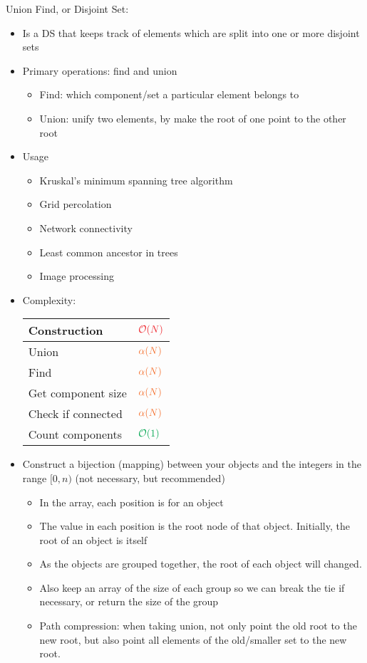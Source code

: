 Union Find, or Disjoint Set:
\begin{itemize}
	\item Is a \ac{DS} that keeps track of elements which are split into one or more disjoint sets
	\item Primary operations: find and union
	\begin{itemize}
		\item Find: which component/set a particular element belongs to
		\item Union: unify two elements, by make the root of one point to the other root
	\end{itemize}
	\item Usage
	\begin{itemize}
		\item Kruskal's minimum spanning tree algorithm
		\item Grid percolation
		\item Network connectivity
		\item Least common ancestor in trees
		\item Image processing
	\end{itemize}
	\item Complexity:
	\begin{center}
		\begin{tabular}{|l|l|}
			\hline
			Construction & $ \color{Red} \mathcal{O}(N) $ \\ \hline
			Union & $ \color{Orange} \alpha(N) $ \\ \hline
			Find & $ \color{Orange} \alpha(N) $ \\ \hline
			Get component size & $ \color{Orange} \alpha(N) $ \\ \hline
			Check if connected & $ \color{Orange} \alpha(N) $ \\ \hline
			Count components & $ \color{Green} \mathcal{O}(1) $ \\ \hline
		\end{tabular}
	\end{center}
	\item Construct a bijection (mapping) between your objects and the integers in the range $ [0, n) $ (not necessary, but recommended)
	\begin{itemize}
		\item In the array, each position is for an object
		\item The value in each position is the root node of that object. Initially, the root of an object is itself
		\item As the objects are grouped together, the root of each object will changed.
		\item Also keep an array of the size of each group so we can break the tie if necessary, or return the size of the group
		\item Path compression: when taking union, not only point the old root to the new root, but also point all elements of the old/smaller set to the new root.
	\end{itemize}
\end{itemize}

